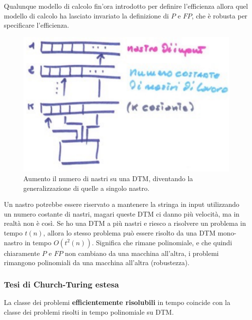 \documentclass{article}
\begin{document}
Qualunque modello di calcolo fin'ora introdotto per definire l'efficienza allora quel
modello di calcolo ha lasciato invariato la definizione di $P$ e $FP$, che è robusta per
specificare l'efficienza.\begin{figure}[H]
    \centering
    \includegraphics[scale=0.6]{images/robustezza.png}
    \caption{Aumento il numero di nastri su una DTM, diventando la generalizzazione
    di quelle a singolo nastro.}
\end{figure}
Un nastro potrebbe essere riservato a mantenere la stringa in input utilizzando un numero
costante di nastri, magari queste DTM ci danno più velocità, ma in realtà non è così. Se ho
una DTM a più nastri e riesco a risolvere un problema in tempo $t(n)$, allora lo stesso
problema può essere risolto da una DTM mono-nastro in tempo $O(t^2(n))$. Significa
che rimane polinomiale, e che quindi chiaramente $P$ e $FP$ non cambiano da una macchina
all'altra, i problemi rimangono polinomiali da una macchina all'altra (robustezza).

\subsubsection{Tesi di Church-Turing estesa}
La classe dei problemi \textbf{efficientemente risolubili} in tempo coincide con
la classe dei problemi risolti in tempo polinomiale su DTM.
\end{document}
